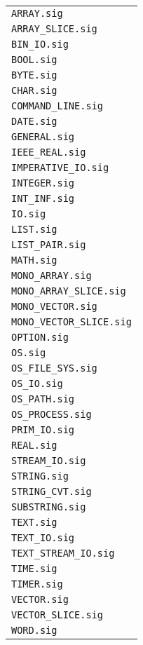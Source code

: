 \documentclass{jbook}
\newcommand{\code}[1]{\mbox{\large\tt #1}}
\begin{document}
\begin{enumerate}
\begin{tabular}{l}
\code{ARRAY.sig}\\
\code{ARRAY\_SLICE.sig}\\
\code{BIN\_IO.sig}\\
\code{BOOL.sig}\\
\code{BYTE.sig}\\
\code{CHAR.sig}\\
\code{COMMAND\_LINE.sig}\\
\code{DATE.sig}\\
\code{GENERAL.sig}\\
\code{IEEE\_REAL.sig}\\
\code{IMPERATIVE\_IO.sig}\\
\code{INTEGER.sig}\\
\code{INT\_INF.sig}\\
\code{IO.sig}\\
\code{LIST.sig}\\
\code{LIST\_PAIR.sig}\\
\code{MATH.sig}\\
\code{MONO\_ARRAY.sig}\\
\code{MONO\_ARRAY\_SLICE.sig}\\
\code{MONO\_VECTOR.sig}\\
\code{MONO\_VECTOR\_SLICE.sig}\\
\code{OPTION.sig}\\
\code{OS.sig}\\
\code{OS\_FILE\_SYS.sig}\\
\code{OS\_IO.sig}\\
\code{OS\_PATH.sig}\\
\code{OS\_PROCESS.sig}\\
\code{PRIM\_IO.sig}\\
\code{REAL.sig}\\
\code{STREAM\_IO.sig}\\
\code{STRING.sig}\\
\code{STRING\_CVT.sig}\\
\code{SUBSTRING.sig}\\
\code{TEXT.sig}\\
\code{TEXT\_IO.sig}\\
\code{TEXT\_STREAM\_IO.sig}\\
\code{TIME.sig}\\
\code{TIMER.sig}\\
\code{VECTOR.sig}\\
\code{VECTOR\_SLICE.sig}\\
\code{WORD.sig}
\end{tabular}


\end{enumerate}
\end{document}
